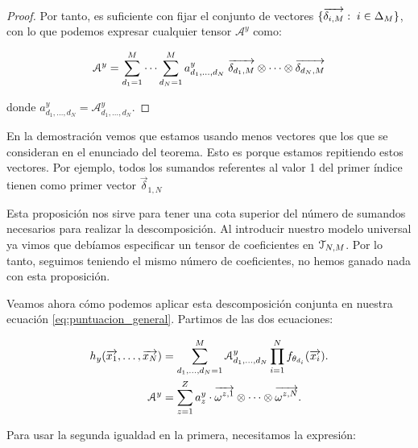 \begin{proof}
    Por tanto, es suficiente con fijar el conjunto de vectores $\{ \overrightarrow{\delta_{i, M}}: \; i \in \Delta_{M} \}$, con lo que podemos expresar cualquier tensor $\mathcal{A}^y$ como:

    \begin{equation}
        \mathcal{A}^y = \sum_{d_1 = 1}^{M} \cdots \sum_{d_N = 1}^{M} a^y_{d_1, \ldots, d_N} \; \overrightarrow{\delta_{d_1, M}} \otimes \cdots \otimes \overrightarrow{\delta_{d_N, M}}
    \end{equation}

    donde $a^y_{d_1, \ldots, d_N} = \mathcal{A}^y_{d_1, \ldots, d_N}$.

\end{proof}

\begin{observacion}
    En la demostración vemos que estamos usando menos vectores que los que se consideran en el enunciado del teorema. Esto es porque estamos repitiendo estos vectores. Por ejemplo, todos los sumandos referentes al valor 1 del primer índice tienen como primer vector $\vec{\delta}_{1, N}$
\end{observacion}

\begin{observacion}
    Esta proposición nos sirve para tener una cota superior del número de sumandos necesarios para realizar la descomposición. Al introducir nuestro modelo universal ya vimos que debíamos especificar un tensor de coeficientes en $\mathcal{T}_{N, M}$. Por lo tanto, seguimos teniendo el mismo número de coeficientes, no hemos ganado nada con esta proposición.
\end{observacion}

Veamos ahora cómo podemos aplicar esta descomposición conjunta en nuestra ecuación \eqref{eq:puntuacion_general}. Partimos de las dos ecuaciones:

\begin{equation}
	\begin{split}
		h_y(\overrightarrow{x_1}, \ldots, \overrightarrow{x_N}) &= \sum_{d_1, \ldots, d_N = 1}^{M} \mathcal{A}^y_{d_1, \ldots, d_N} \prod_{i = 1}^N f_{\theta_{d_i}}(\overrightarrow{x_i}). \\
		\mathcal{A}^y &= \sum_{z = 1}^Z a_z^y \cdot \overrightarrow{\omega^{z, 1}} \otimes \cdots \otimes \overrightarrow{\omega^{z, N}}. \\
	\end{split}
\end{equation}

Para usar la segunda igualdad en la primera, necesitamos la expresión:

